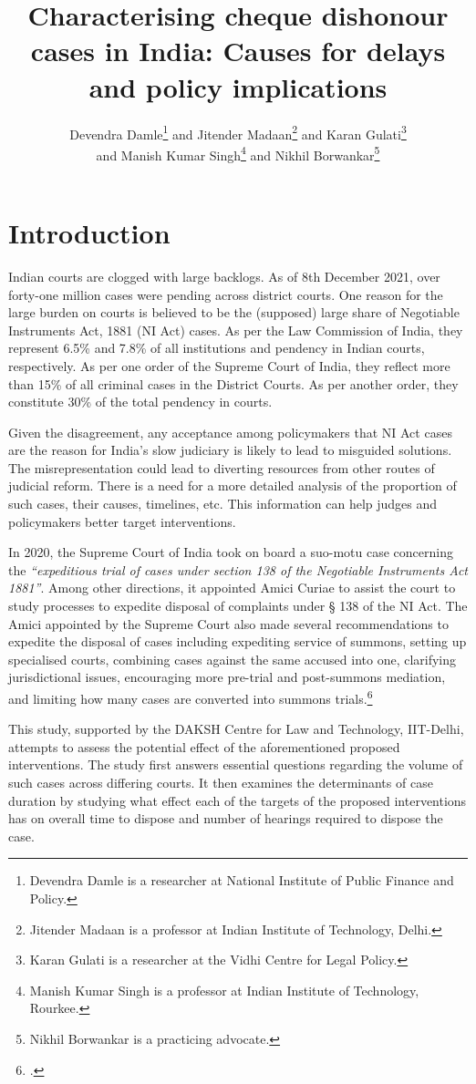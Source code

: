 \documentclass[11pt,a4paper]{article}
\title{Characterising cheque dishonour cases in India: Causes for delays and policy implications}
\author{Devendra Damle\thanks{Devendra Damle is a researcher at National Institute of Public Finance and Policy.} and Jitender Madaan\thanks{Jitender Madaan is a professor at Indian Institute of Technology, Delhi.} and Karan Gulati\thanks{Karan Gulati is a researcher at the Vidhi Centre for Legal Policy.}\\ and Manish Kumar Singh\thanks{Manish Kumar Singh is a professor at Indian Institute of Technology, Rourkee.} and Nikhil Borwankar\thanks{Nikhil Borwankar is a practicing advocate.}}
\date{}
\begin{document}
\maketitle

\section{Introduction}

Indian courts are clogged with large backlogs. As of 8th December 2021, over forty-one million cases were pending across district courts. One reason for the large burden on courts is believed to be the (supposed) large share of Negotiable Instruments Act, 1881 (NI Act) cases. As per the Law Commission of India, they represent 6.5\% and 7.8\% of all institutions and pendency in Indian courts, respectively. As per one order of the Supreme Court of India, they reflect more than 15\% of all criminal cases in the District Courts. As per another order, they constitute 30\% of the total pendency in courts.

Given the disagreement, any acceptance among policymakers that NI Act cases are the reason for India’s slow judiciary is likely to lead to misguided solutions. The misrepresentation could lead to diverting resources from other routes of judicial reform. There is a need for a more detailed analysis of the proportion of such cases, their causes, timelines, etc. This information can help judges and policymakers better target interventions.

In 2020, the Supreme Court of India took on board a suo-motu case concerning the \emph{``expeditious trial of cases under section 138 of the Negotiable Instruments Act 1881''}. Among other directions, it appointed Amici Curiae to assist the court to study processes to expedite disposal of complaints under § 138 of the NI Act. The Amici appointed by the Supreme Court also made several recommendations to expedite the disposal of cases including expediting service of summons, setting up specialised courts, combining cases against the same accused into one, clarifying jurisdictional issues, encouraging more pre-trial and post-summons mediation, and limiting how many cases are converted into summons trials.\footcite{amicus2020_submission}

This study, supported by the DAKSH Centre for Law and Technology, IIT-Delhi, attempts to assess the potential effect of the aforementioned proposed interventions. The study first answers essential questions regarding the volume of such cases across differing courts. It then examines the determinants of case duration by studying what effect each of the targets of the proposed interventions has on overall time to dispose and number of hearings required to dispose the case.
\end{document}
